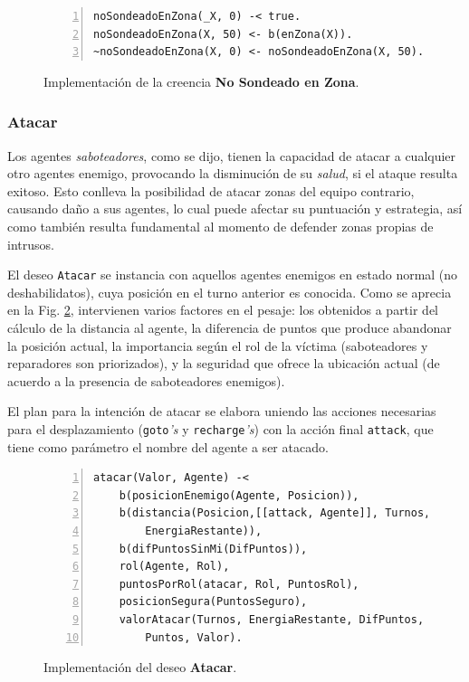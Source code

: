 \documentclass[oneside]{book}
\theoremstyle{definition}
\begin{document}
\begin{figure}[h]
\begin{Verbatim}[numbers=left]
noSondeadoEnZona(_X, 0) -< true.
noSondeadoEnZona(X, 50) <- b(enZona(X)).
~noSondeadoEnZona(X, 0) <- noSondeadoEnZona(X, 50).
\end{Verbatim}
\caption{Implementación de la creencia \textbf{No Sondeado 
en Zona}.}
\label{fig:creenciaNoSondeado}
\end{figure}

\subsubsection{Atacar}

Los agentes \textit{saboteadores}, como se dijo, tienen la capacidad de atacar a cualquier otro 
agentes enemigo, provocando la disminución de su \textit{salud}, si el ataque resulta exitoso.
Esto conlleva la posibilidad de atacar zonas del equipo contrario, causando daño a sus agentes, 
lo cual puede afectar su puntuación y estrategia, así como también resulta fundamental 
al momento de defender zonas propias de intrusos.

El deseo \texttt{Atacar} se instancia con aquellos agentes enemigos en estado normal (no deshabilidatos),
cuya posición en el turno anterior es conocida. Como se aprecia en la Fig. \ref{fig:deseoAtacar}, 
intervienen varios factores en el pesaje: los obtenidos a partir del cálculo de la distancia al 
agente, la diferencia de puntos que produce abandonar la posición actual, la importancia según el 
rol de la víctima (saboteadores y reparadores son priorizados), y la seguridad que ofrece la ubicación
actual (de acuerdo a la presencia de saboteadores enemigos). 

El plan para la intención de atacar se elabora uniendo las acciones necesarias para el desplazamiento
(\texttt{goto}\textit{'s} y \texttt{recharge}\textit{'s}) con la acción final \texttt{attack}, que 
tiene como parámetro el nombre del agente a ser atacado.

\begin{figure}[h]
\begin{Verbatim}[numbers=left]
atacar(Valor, Agente) -<
    b(posicionEnemigo(Agente, Posicion)),
    b(distancia(Posicion,[[attack, Agente]], Turnos, 
    	EnergiaRestante)),
	b(difPuntosSinMi(DifPuntos)),
    rol(Agente, Rol),
	puntosPorRol(atacar, Rol, PuntosRol),
	posicionSegura(PuntosSeguro),
	valorAtacar(Turnos, EnergiaRestante, DifPuntos, PuntosSeguro, 
		Puntos, Valor).
\end{Verbatim}
\caption{Implementación del deseo \textbf{Atacar}.}
\label{fig:deseoAtacar}
\end{figure}
\end{document}
